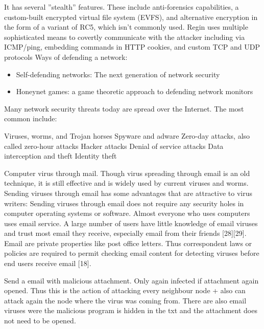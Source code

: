 It has several ''stealth'' features. These include anti-forensics capabilities, a custom-built encrypted virtual file system (EVFS), and alternative encryption in the form of a variant of RC5, which isn't commonly used. Regin uses multiple sophisticated means to covertly communicate with the attacker including via ICMP/ping, embedding commands in HTTP cookies, and custom TCP and UDP protocols
Ways of defending a network:
\begin{itemize}
\item Self-defending networks: The next generation of network security
\item Honeynet games: a game theoretic approach to defending network monitors

\end{itemize}
Many network security threats today are spread over the Internet. The most common include:

Viruses, worms, and Trojan horses
Spyware and adware
Zero-day attacks, also called zero-hour attacks
Hacker attacks
Denial of service attacks
Data interception and theft
Identity theft


Computer virus through mail. 
Though virus spreading through email is an old technique, it is still effective and is widely used by
current viruses and worms. Sending viruses through email has some advantages that are attractive to
virus writers:
 Sending viruses through email does not require any security holes in computer operating systems
or software.
 Almost everyone who uses computers uses email service.
 A large number of users have little knowledge of email viruses and trust most email they receive,
especially email from their friends [28][29].
 Email are private properties like post office letters. Thus correspondent laws or policies are required
to permit checking email content for detecting viruses before end users receive email [18].

Send a email with malicious attachment. Only again infected if attachment again opened. Thus this is the action of attacking every neighbour node + also can attack again the node where the virus was coming from.
There are also email viruses were the malicious program is hidden in the txt and the attachment does not need to be opened. 


